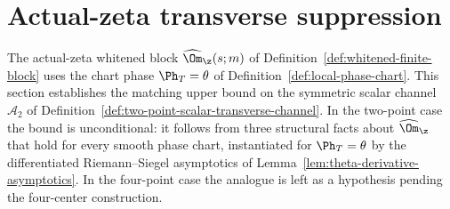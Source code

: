 %
%
%

\section{Actual-zeta transverse suppression}
\label{sec:actual-zeta-transverse-suppression}
\quad
{}\quad
{}\quad
{}\quad
{}\quad
{}
\par\medskip

The actual-zeta whitened block \(\widehat\Om_\z(s;m)\) of
Definition~\ref{def:whitened-finite-block} uses the chart phase
\(\Ph_T=\theta\) of Definition~\ref{def:local-phase-chart}.  This
section establishes the matching upper bound on the symmetric scalar
channel \(\mathcal A_2\) of
Definition~\ref{def:two-point-scalar-transverse-channel}.  In the
two-point case the bound is unconditional: it follows from three
structural facts about \(\widehat\Om_\z\) that hold for every smooth
phase chart, instantiated for \(\Ph_T=\theta\) by the differentiated
Riemann--Siegel asymptotics of
Lemma~\ref{lem:theta-derivative-asymptotics}.  In the four-point case
the analogue is left as a hypothesis pending the four-center
construction.

